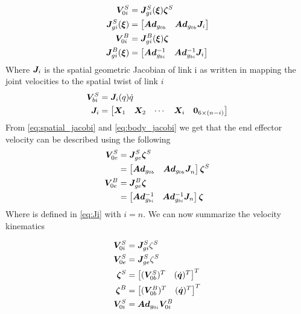 \begin{align}
	\boldsymbol V_{0i}^S&= \boldsymbol J_{gi}^{S}(\boldsymbol \xi)\boldsymbol \zeta^S
  \label{eq:spatial_jacobi}
  \\
	\boldsymbol J_{gi}^{S}(\boldsymbol \xi) &= \begin{bmatrix} \boldsymbol{Ad}_{g_{0b}} & \boldsymbol{Ad}_{g_{0b}} \boldsymbol J_i\end{bmatrix}
  \label{eq:spatial_jacobi2}
	\\
	\boldsymbol V_{0i}^B&= \boldsymbol J_{gi}^{B}(\boldsymbol \xi)\boldsymbol \zeta
  \label{eq:body_jacobi}
  \\
	\boldsymbol J_{gi}^{B}(\boldsymbol \xi) &= \begin{bmatrix} \boldsymbol{Ad}_{g_{bi}}^{-1} & \boldsymbol{Ad}_{g_{bi}}^{-1} \boldsymbol J_i\end{bmatrix}
  \label{eq:body_jacobi2}
\end{align}
Where $\boldsymbol J_i$ is the spatial geometric Jacobian of link i as written in \cite{kristin_jant} mapping the joint velocities to the spatial twist of link $i$
\begin{align}
  \boldsymbol V_{bi}^S &=\boldsymbol J_i(q)\dot q
  \label{eq:mappint1}
	\\
	\boldsymbol J_i&=\begin{bmatrix}  \boldsymbol X_1 & \boldsymbol X_2 & \cdots & \boldsymbol X_i & \boldsymbol 0_{6 \times (n-i)}    \end{bmatrix}
	\label{eq:Ji}
\end{align}
From \eqref{eq:spatial_jacobi} and \eqref{eq:body_jacobi} we get that the end effector velocity can be described using the following
\begin{align}
	\boldsymbol V_{0e}^S &= \boldsymbol J_{ge}^{S}\boldsymbol \zeta^S
	\label{eq:ee_velo}
	\\
	&=\begin{bmatrix} \boldsymbol{Ad}_{g_{0b}} & \boldsymbol{Ad}_{g_{0b}}\boldsymbol J_{n}^{}\end{bmatrix}\boldsymbol \zeta^S
	\\
	\boldsymbol V_{0e}^B &= \boldsymbol J_{ge}^{B}\boldsymbol \zeta
	\label{eq:ee_velo_body}
	\\
	&= \begin{bmatrix} \boldsymbol{Ad}_{g_{bi}}^{-1} & \boldsymbol{Ad}_{g_{bi}}^{-1} \boldsymbol J_n\end{bmatrix}\boldsymbol \zeta
\end{align}
Where  is defined in \eqref{eq:Ji} with $i=n$. We can now summarize the velocity kinematics
\begin{mdframed}[style=graybox]
	\begin{align}
	\boldsymbol V_{0i}^S&=\boldsymbol J_{gi}^{S}\zeta^S \\
	\boldsymbol V_{0e}^S&=\boldsymbol J_{ge}^{S}\zeta^S \\
	\boldsymbol \zeta^S&=\begin{bmatrix} (\boldsymbol V_{0b}^S)^T & (\dot{\boldsymbol q})^T \end{bmatrix}^T \\
	\boldsymbol \zeta^B&=\begin{bmatrix} (\boldsymbol V_{0b}^B)^T & (\dot{\boldsymbol q})^T \end{bmatrix}^T \\
	\boldsymbol V_{0i}^S&=\boldsymbol{Ad}_{g_{0i}}\boldsymbol V_{0i}^B
\end{align}
\end{mdframed}

